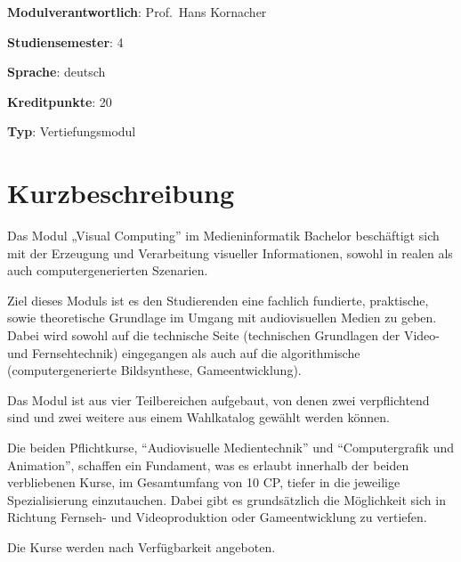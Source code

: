 \begin{modulHead}
\textbf{Modulverantwortlich}: Prof.~Hans
Kornacher
\end{modulHead}
\begin{modulHead}
\textbf{Studiensemester}:
4
\end{modulHead}
\begin{modulHead}
\textbf{Sprache}:
deutsch
\end{modulHead}
\begin{modulHead}
\textbf{Kreditpunkte}:
20
\end{modulHead}
\begin{modulHead}
\textbf{Typ}:
Vertiefungsmodul
\end{modulHead}


\hypertarget{kurzbeschreibungpathlabelmi-2017modulbeschreibungen-bachelorba_vertiefung-visual-computing}{%
\section*{Kurzbeschreibung\label{/mi-2017/modulbeschreibungen-bachelor/BA_Vertiefung-Visual-Computing}}\label{kurzbeschreibungpathlabelmi-2017modulbeschreibungen-bachelorba_vertiefung-visual-computing}}

Das Modul „Visual Computing'' im Medieninformatik Bachelor beschäftigt
sich mit der Erzeugung und Verarbeitung visueller Informationen, sowohl
in realen als auch computergenerierten Szenarien.

Ziel dieses Moduls ist es den Studierenden eine fachlich fundierte,
praktische, sowie theoretische Grundlage im Umgang mit audiovisuellen
Medien zu geben. Dabei wird sowohl auf die technische Seite (technischen
Grundlagen der Video- und Fernsehtechnik) eingegangen als auch auf die
algorithmische (computergenerierte Bildsynthese, Gameentwicklung).

Das Modul ist aus vier Teilbereichen aufgebaut, von denen zwei
verpflichtend sind und zwei weitere aus einem Wahlkatalog gewählt werden
können.

Die beiden Pflichtkurse, ``Audiovisuelle Medientechnik'' und
``Computergrafik und Animation'', schaffen ein Fundament, was es erlaubt
innerhalb der beiden verbliebenen Kurse, im Gesamtumfang von 10 CP,
tiefer in die jeweilige Spezialisierung einzutauchen. Dabei gibt es
grundsätzlich die Möglichkeit sich in Richtung Fernseh- und
Videoproduktion oder Gameentwicklung zu vertiefen.

Die Kurse werden nach Verfügbarkeit angeboten.

